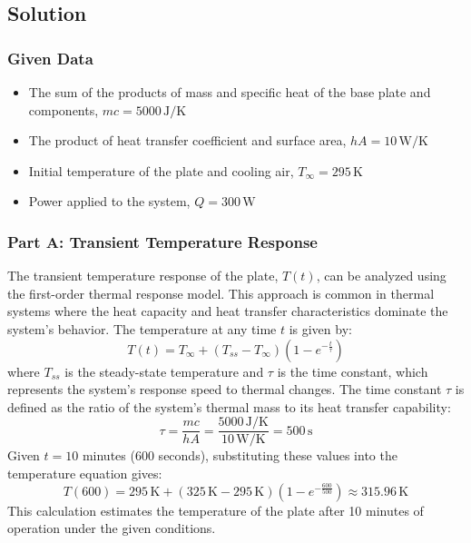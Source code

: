 \documentclass{article}
\numberwithin{equation}{section}
\begin{document}
\subsection*{Solution}

\subsubsection*{Given Data}
\begin{itemize}
    \item The sum of the products of mass and specific heat of the base plate and components, \(mc = 5000 \, \text{J/K}\)
    \item The product of heat transfer coefficient and surface area, \(hA = 10 \, \text{W/K}\)
    \item Initial temperature of the plate and cooling air, \(T_{\infty} = 295 \, \text{K}\)
    \item Power applied to the system, \(Q = 300 \, \text{W}\)
\end{itemize}

\subsubsection*{Part A: Transient Temperature Response}
The transient temperature response of the plate, \(T(t)\), can be analyzed using the first-order thermal response model. This approach is common in thermal systems where the heat capacity and heat transfer characteristics dominate the system's behavior. The temperature at any time \(t\) is given by:
\begin{equation}
    T(t) = T_{\infty} + (T_{ss} - T_{\infty})(1 - e^{-\frac{t}{\tau}})
\end{equation}
where \(T_{ss}\) is the steady-state temperature and \(\tau\) is the time constant, which represents the system's response speed to thermal changes. The time constant \(\tau\) is defined as the ratio of the system's thermal mass to its heat transfer capability:
\begin{equation}
    \tau = \frac{mc}{hA} = \frac{5000 \, \text{J/K}}{10 \, \text{W/K}} = 500 \, \text{s}
\end{equation}
Given \(t = 10\) minutes (\(600\) seconds), substituting these values into the temperature equation gives:
\begin{equation}
    T(600) = 295 \, \text{K} + (325 \, \text{K} - 295 \, \text{K})(1 - e^{-\frac{600}{500}}) \approx 315.96 \, \text{K}
\end{equation}
This calculation estimates the temperature of the plate after 10 minutes of operation under the given conditions.
\end{document}

